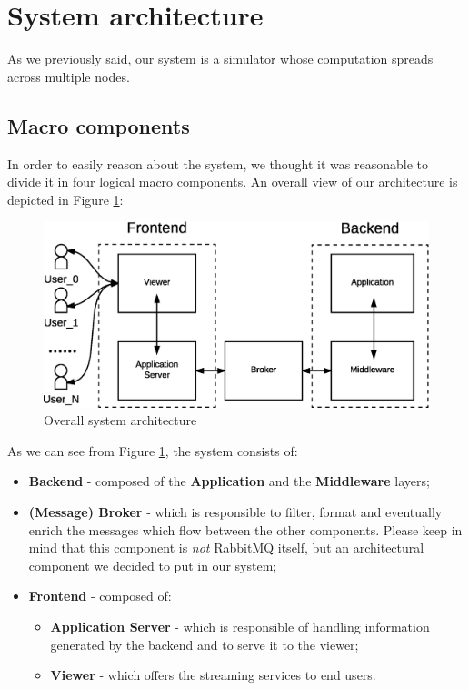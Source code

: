 \section{System architecture}
As we previously said, our system is a simulator whose computation spreads
across multiple nodes.

\subsection{Macro components}

In order to easily reason about the system, we thought it was reasonable to
divide it in four logical macro components.
An overall view of our architecture
is depicted in Figure \ref{fig:sd-sys-arch-overall}:

\begin{figure}[H]
  \centering
  \includegraphics[scale=0.5,keepaspectratio]
    {images/solution/overall-arch.eps}
  \caption{Overall system architecture}
  \label{fig:sd-sys-arch-overall}
\end{figure}

As we can see from Figure \ref{fig:sd-sys-arch-overall}, the system consists of:

\begin{itemize}
  \item \textbf{Backend} - composed of the \textbf{Application} and the
    \textbf{Middleware} layers;
  \item \textbf{(Message) Broker} - which is responsible to filter, format
    and eventually enrich the messages which flow between the other components.
    Please keep in mind that this component is \textit{not} RabbitMQ itself,
    but an architectural component we decided to put in our system;
  \item \textbf{Frontend} - composed of:
  \begin{itemize}
    \item \textbf{Application Server} - which is responsible of handling
      information generated by the backend and to serve it to the viewer;
    \item \textbf{Viewer} - which offers the streaming services to end users.
  \end{itemize}
\end{itemize}

